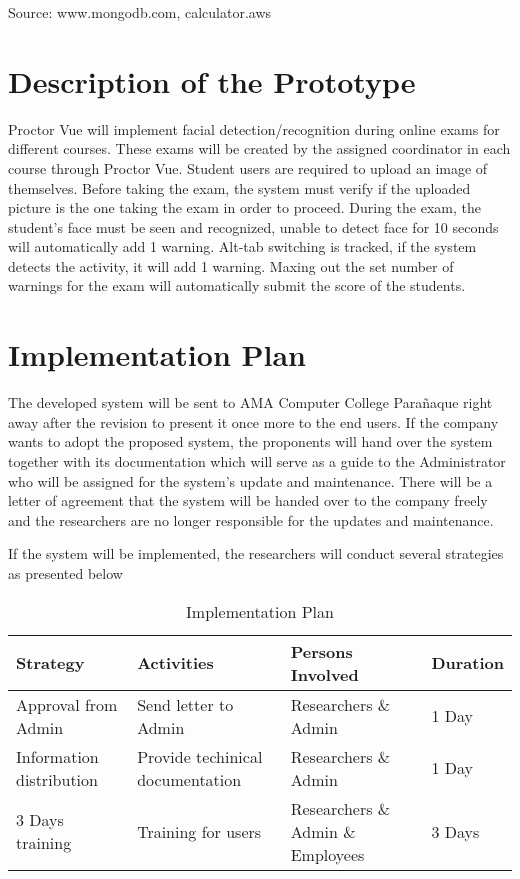 Source: www.mongodb.com, calculator.aws

\section{Description of the Prototype}

Proctor Vue will implement facial detection/recognition during online exams for different courses.
These exams will be created by the assigned coordinator in each course through Proctor Vue.
Student users are required to upload an image of themselves.
Before taking the exam, the system must verify if the uploaded picture is the one taking the exam in order to proceed.
During the exam, the student's face must be seen and recognized, unable to detect face for 10 seconds will automatically add 1 warning.
Alt-tab switching is tracked, if the system detects the activity, it will add 1 warning.
Maxing out the set number of warnings for the exam will automatically submit the score of the students.

\section{Implementation Plan}

The developed system will be sent to AMA Computer College Parañaque right away after the revision to present it once more to the end users.
If the company wants to adopt the proposed system, the proponents will hand over the system together with its documentation which will serve as a guide to the Administrator who will be assigned for the system's update and maintenance.
There will be a letter of agreement that the system will be handed over to the company freely and the researchers are no longer responsible for the updates and maintenance.

If the system will be implemented, the researchers will conduct several strategies as presented below

\vspace{1cm}

\begin{table}[h!]
   \begin{center}
      \begin{tabular}{|m{10em}|m{8em}|m{10em}|m{4em}|}
         \hline
         \textbf{Strategy}        & \textbf{Activities}              & \textbf{Persons Involved}         & \textbf{Duration} \\
         \hline
         Approval from Admin      & Send letter to Admin             & Researchers \& Admin              & 1 Day             \\
         \hline
         Information distribution & Provide techinical documentation & Researchers \& Admin              & 1 Day             \\
         \hline
         3 Days training          & Training for users               & Researchers \& Admin \& Employees & 3 Days            \\
         \hline
      \end{tabular}
   \end{center}

   \caption{Implementation Plan}
\end{table}
